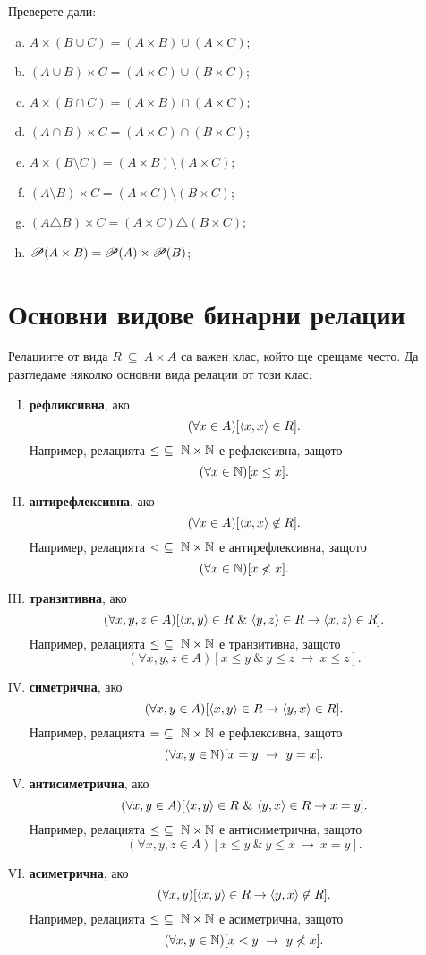 \begin{problem}
  Преверете дали:
  \begin{enumerate}[a)]
  \item 
    $A\times(B\cup C) = (A\times B) \cup (A\times C)$;
  \item
    $(A\cup B)\times C = (A\times C)\cup (B\times C)$;
  \item 
    $A\times(B\cap C) = (A\times B) \cap (A\times C)$;
  \item
    $(A \cap B)\times C = (A \times C)\cap(B\times C)$;
  \item 
    $A\times(B\setminus C) = (A\times B) \setminus (A\times C)$;
  \item
    $(A\setminus B)\times C = (A\times C)\setminus (B\times C)$;
  \item
    $(A\triangle B)\times C = (A\times C)\triangle (B\times C)$;
  \item
    $\mathscr{P}(A \times B) = \mathscr{P}(A) \times \mathscr{P}(B)$;
  \end{enumerate}
\end{problem}

\section{Основни видове бинарни релации}
Релациите от вида $R\ \subseteq\ A\times A$ са важен клас, който ще срещаме често.
Да разгледаме няколко основни вида релации от този клас:
\begin{enumerate}[I)]
\item
  {\bf рефликсивна}, ако
  \[(\forall x\in A)[\langle{x,x}\rangle\in R].\]
  Например, релацията $\leq\ \subseteq\ \Nat\times\Nat$ е рефлексивна, защото
  \[(\forall x\in \mathbb{N})[x \leq x].\]
\item
  {\bf антирефлексивна}, ако
  \[(\forall x\in A)[\langle{x,x}\rangle\not\in R].\]
  Например, релацията $<\ \subseteq\ \Nat\times\Nat$ е антирефлексивна, защото
  \[(\forall x\in \mathbb{N})[x \not< x].\]
\item
  {\bf транзитивна}, ако
  \[(\forall x,y,z\in A)[\pair{x,y}\in R\ \&\ \pair{y,z}\in R \rightarrow \pair{x,z}\in R].\]
  Например, релацията $\leq\ \subseteq\ \Nat\times\Nat$ е транзитивна, защото
  \[(\forall x,y,z\in A)[x \leq y\ \&\ y \leq z\ \rightarrow\ x\leq z].\]
\item
  {\bf симетрична}, ако
  \[(\forall x,y\in A)[\langle{x,y}\rangle\in R \rightarrow \langle{y,x}\rangle\in R].\]
  Например, релацията $=\ \subseteq\ \mathbb{N}\times\mathbb{N}$ е рефлексивна, защото
  \[(\forall x,y\in \Nat)[x = y\ \rightarrow\ y = x].\]
\item
  {\bf антисиметрична}, ако
  \[(\forall x,y\in A)[\pair{x,y}\in R\ \&\ \pair{y,x}\in R \rightarrow x = y].\]
  Например, релацията $\leq\ \subseteq\ \Nat\times\Nat$ е антисиметрична, защото
  \[(\forall x,y,z\in A)[x \leq y\ \&\ y \leq x\ \rightarrow\ x = y].\]
\item
  {\bf асиметрична}, ако
  \[(\forall x,y)[\langle{x,y}\rangle\in R \rightarrow \langle{y,x}\rangle\not\in R].\]
  Например, релацията $\leq\ \subseteq\ \Nat\times\Nat$ е асиметрична, защото
  \[(\forall x,y\in \mathbb{N})[x < y\ \rightarrow\ y \not< x].\]
\end{enumerate}

